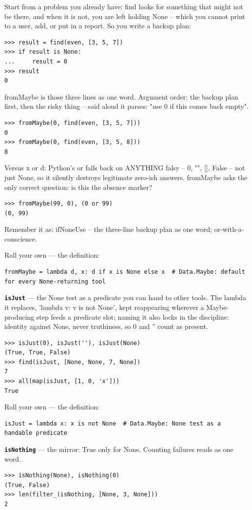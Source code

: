 \documentclass[10pt,letterpaper]{article}
\begin{document}
Start from a problem you already have: find looks for something that might not be there, and when it is not, you are left holding None -- which you cannot print to a user, add, or put in a report. So you write a backup plan:

\begin{lstlisting}[style=ex]
>>> result = find(even, [3, 5, 7])
>>> if result is None:
...     result = 0
>>> result
0
\end{lstlisting}

fromMaybe is those three lines as one word. Argument order: the backup plan first, then the risky thing -- said aloud it parses: "use 0 if this comes back empty".

\begin{lstlisting}[style=ex]
>>> fromMaybe(0, find(even, [3, 5, 7]))
0
>>> fromMaybe(0, find(even, [3, 5, 8]))
8
\end{lstlisting}

Versus x or d: Python's or falls back on ANYTHING falsy -- 0, "", [], False -- not just None, so it silently destroys legitimate zero-ish answers. fromMaybe asks the only correct question: is this the absence marker?

\begin{lstlisting}[style=ex]
>>> fromMaybe(99, 0), (0 or 99)
(0, 99)
\end{lstlisting}

Remember it as: ifNoneUse -- the three-line backup plan as one word; or-with-a-conscience.


Roll your own --- the definition:

\begin{lstlisting}[style=ex]
fromMaybe = lambda d, x: d if x is None else x  # Data.Maybe: default for every None-returning tool
\end{lstlisting}
\textbf{\texttt{isJust}} --- the None test as a predicate you can hand to other tools. The lambda it replaces, 'lambda v: v is not None', kept reappearing wherever a Maybe-producing step feeds a predicate slot; naming it also locks in the discipline: identity against None, never truthiness, so 0 and '' count as present.
\begin{lstlisting}[style=ex]
>>> isJust(0), isJust(''), isJust(None)
(True, True, False)
>>> find(isJust, [None, None, 7, None])
7
>>> all(map(isJust, [1, 0, 'x']))
True
\end{lstlisting}

Roll your own --- the definition:

\begin{lstlisting}[style=ex]
isJust = lambda x: x is not None  # Data.Maybe: None test as a handable predicate
\end{lstlisting}
\textbf{\texttt{isNothing}} --- the mirror: True only for None. Counting failures reads as one word.
\begin{lstlisting}[style=ex]
>>> isNothing(None), isNothing(0)
(True, False)
>>> len(filter_(isNothing, [None, 3, None]))
2
\end{lstlisting}
\end{document}
